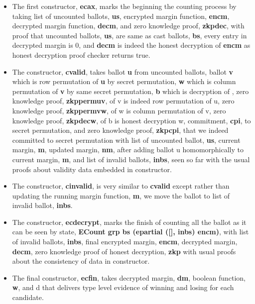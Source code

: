 \documentclass{llncs}
\begin{document}
\begin{itemize}
\item The first constructor, \textbf{ecax}, marks the beginning the counting process by 
	  taking list of uncounted ballots, \textbf{us},
      encrypted margin function, \textbf{encm}, decrypted margin function, \textbf{decm}, 
      and zero knowledge proof, \textbf{zkpdec}, with proof that uncounted 
      ballots, \textbf{us}, are same as 
      cast ballots, \textbf{bs}, every entry in decrypted margin is 0, and 
      \textbf{decm} is indeed the 
      honest decryption of \textbf{encm} as honest decryption proof checker returns true.
 \item The constructor, \textbf{cvalid}, takes ballot \textbf{u} from uncounted 
 		ballots, ballot 
 		\textbf{v} which is row permutation of \textbf{u }by secret permutation, 
 		\textbf{w} which is column permutation of \textbf{v} by same secret permutation, 
 		\textbf{b} which is decryption of , zero knowledge proof, 
 		\textbf{zkppermuv}, of v is indeed row permutation of u, 
 		zero knowledge proof, \textbf{zkppermvw}, of w is column permutation of 
 		v, zero knowledge proof, \textbf{zkpdecw}, of b is honest decryption w,
 		commitment, \textbf{cpi}, to secret permutation, and zero knowledge proof, 
 		\textbf{zkpcpi}, that we indeed committed to secret permutation 
 		with list of uncounted ballot, \textbf{us}, current margin, \textbf{m}, 
 		updated margin, \textbf{nm}, after adding ballot u homomorphically to 
 		current margin, \textbf{m}, and list of invalid ballots, \textbf{inbs}, 
 		seen so far with the usual proofs about validity data embedded in constructor. 
 \item The constructor, \textbf{cinvalid}, is very similar to \textbf{cvalid} except 
       rather than updating the running margin function, \textbf{m}, we move the ballot 
       to list of invalid ballot, \textbf{inbs}.
 \item The constructor, \textbf{ecdecrypt}, marks the finish of counting all the 
       ballot as it can be seen by state, 
       \textbf{ ECount grp bs (epartial ([], inbs) encm)}, with list of 
       invalid ballots, \textbf{inbs}, final encrypted margin, \textbf{encm}, 
       decrypted margin, \textbf{decm}, zero knowledge proof of honest 
       decryption, \textbf{zkp} with usual proofs about the consistency of data 
       in constructor. 
 \item The final constructor, \textbf{ecfin}, takes decrypted margin, \textbf{dm}, 
       boolean function, \textbf{w}, and d that delivers type level evidence of 
       winning and losing for each candidate.
   
\end{itemize}
\end{document}
